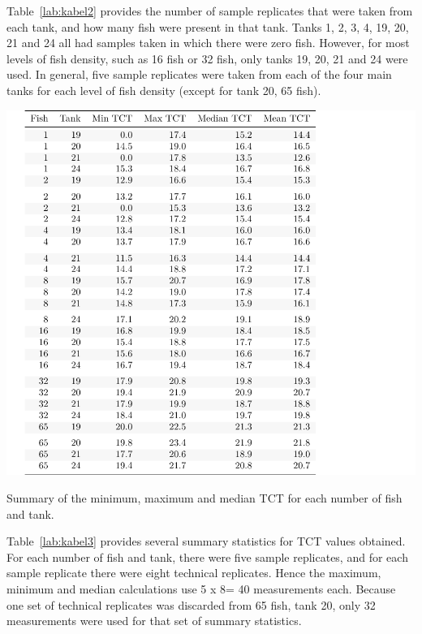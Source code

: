 Table~\ref{lab:kabel2} provides the number of sample replicates that were taken from each tank, and how many fish were present in that tank. Tanks 1, 2, 3, 4, 19, 20, 21 and 24 all had samples taken in which there were zero fish. However, for most levels of fish density, such as 16 fish or 32 fish, only tanks 19, 20, 21 and 24 were used. In general, five sample replicates were taken from each of the four main tanks for each level of fish density (except for tank 20, 65 fish).

\begin{table}[H]
\includegraphics{Chapter3Images/kable3fixed2.pdf}
\caption{\hspace{1mm} Summary of the minimum, maximum and median TCT for each number of fish and tank.}
\label{lab:kabel3}
\end{table}

Table~\ref{lab:kabel3} provides several summary statistics for TCT values obtained. For each number of fish and tank, there were five sample replicates, and for each sample replicate there were eight technical replicates. Hence the maximum, minimum and median calculations use 5 x 8= 40 measurements each. Because one set of technical replicates was discarded from 65 fish, tank 20, only 32 measurements were used for that set of summary statistics.


